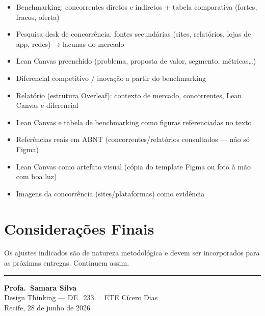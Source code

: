 \documentclass[
  sigconf,
  nonacm, %
  language=portuguese
]{acmart}
\begin{document}
\begin{itemize}[leftmargin=14pt,itemsep=1pt,topsep=3pt,parsep=0pt]
  \item[$\square$] {\small\textcolor{cmuted}{Benchmarking: concorrentes diretos e indiretos + tabela comparativa (fortes, fracos, oferta)}}
  \item[$\square$] {\small\textcolor{cmuted}{Pesquisa desk de concorrência: fontes secundárias (sites, relatórios, lojas de app, redes) → lacunas do mercado}}
  \item[$\square$] {\small\textcolor{cmuted}{Lean Canvas preenchido (problema, proposta de valor, segmento, métricas…)}}
  \item[$\square$] {\small\textcolor{cmuted}{Diferencial competitivo / inovação a partir do benchmarking}}
  \item[$\square$] {\small\textcolor{cmuted}{Relatório (estrutura Overleaf): contexto de mercado, concorrentes, Lean Canvas e diferencial}}
  \item[$\square$] {\small\textcolor{cmuted}{Lean Canvas e tabela de benchmarking como figuras referenciadas no texto}}
  \item[$\square$] {\small\textcolor{cmuted}{Referências reais em ABNT (concorrentes/relatórios consultados — não só Figma)}}
  \item[$\square$] {\small\textcolor{cmuted}{Lean Canvas como artefato visual (cópia do template Figma ou foto à mão com boa luz)}}
  \item[$\square$] {\small\textcolor{cmuted}{Imagens da concorrência (sites/plataformas) como evidência}}
\end{itemize}

\section{Considerações Finais}

Os ajustes indicados são de natureza metodológica e devem ser
incorporados para as próximas entregas.
Continuem assim.


\vspace{1.5em}
\noindent\rule{\linewidth}{0.4pt}

\begin{flushright}
\textbf{Profa.\ Samara Silva}\\
{\small\color{cmuted} Design Thinking --- DE\_233 · ETE Cícero Dias}\\
{\small\color{cmuted} Recife, 28 de junho de 2026}
\end{flushright}
\end{document}
